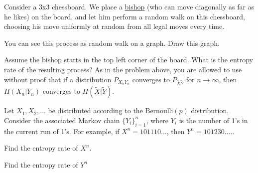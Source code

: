 \documentclass[a4paper,10pt,landscape,twocolumn]{scrartcl}
\begin{document}



\begin{exercise}
Consider a 3x3 chessboard. We place a \href{https://en.wikipedia.org/wiki/Bishop_(chess)}{bishop} (who can move diagonally as far as he likes) on the board, and let him perform a random walk on this chessboard, choosing his move uniformly at random from all legal moves every time. 

\begin{subex}
You can see this process as random walk on a graph. Draw this graph.
\end{subex}

\begin{subex}
Assume the bishop starts in the top left corner of the board. What is the entropy rate of the resulting process? As in the problem above, you are allowed to use without proof that if a distribution $P_{X_n Y_n}$ converges to $P_{\tilde{X} \tilde{Y}}$ for $n \to \infty$, then $H(X_n|Y_n)$ converges to $H(\tilde{X}|\tilde{Y})$.
\end{subex}

\end{exercise}


\begin{exercise}
Let $X_1, X_2, ...$ be distributed according to the Bernoulli$(p)$ distribution. Consider the associated Markov chain $\{Y_i\}_{i=1}^n$, where $Y_i$ is the number of 1's in the current run of 1's. For example, if $X^n = 101110...$, then $Y^n = 101230....$.
\begin{subex}
Find the entropy rate of $X^n$.
\end{subex}
\begin{subex}
Find the entropy rate of $Y^n$
\end{subex}
\end{exercise}
\end{document}
